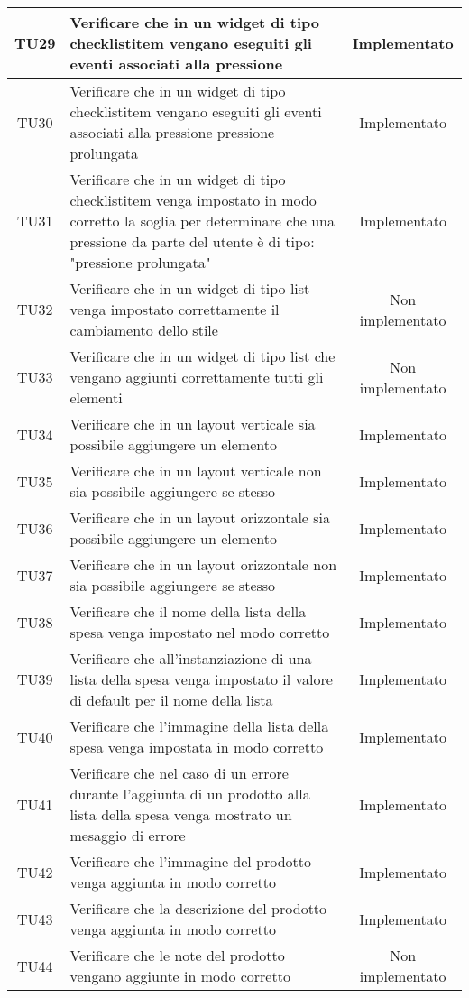 \begin{center}
\begin{longtable}{|c|>{\centering}m{10cm}|c|}
		TU29 & Verificare che in un widget di tipo checklistitem vengano eseguiti gli eventi associati alla pressione & Implementato \\ \hline
		TU30 & Verificare che in un widget di tipo checklistitem vengano eseguiti gli eventi associati alla pressione pressione prolungata & Implementato \\ \hline
		TU31 & Verificare che in un widget di tipo checklistitem venga impostato in modo corretto la soglia per determinare che una pressione da parte del utente è di tipo: "pressione prolungata" & Implementato \\ \hline
		TU32 & Verificare che in un widget di tipo list venga impostato correttamente il cambiamento dello stile & Non implementato \\ \hline
		TU33 & Verificare che in un widget di tipo list che vengano aggiunti correttamente tutti gli elementi & Non implementato \\ \hline
		TU34 & Verificare che in un layout verticale sia possibile aggiungere un elemento & Implementato \\ \hline
		TU35 & Verificare che in un layout verticale non sia possibile aggiungere se stesso & Implementato \\ \hline
		TU36 & Verificare che in un layout orizzontale sia possibile aggiungere un elemento & Implementato \\ \hline
		TU37 & Verificare che in un layout orizzontale non sia possibile aggiungere se stesso & Implementato \\ \hline
		TU38 & Verificare che il nome della lista della spesa venga impostato nel modo corretto & Implementato \\ \hline
		TU39 & Verificare che all'instanziazione di una lista della spesa venga impostato il valore di default per il nome della lista & Implementato \\ \hline
		TU40 & Verificare che l'immagine della lista della spesa venga impostata in modo corretto & Implementato \\ \hline
		TU41 & Verificare che nel caso di un errore durante l'aggiunta di un prodotto alla lista della spesa venga mostrato un mesaggio di errore & Implementato \\ \hline
		TU42 & Verificare che l'immagine del prodotto venga aggiunta in modo corretto & Implementato \\ \hline
		TU43 & Verificare che la descrizione del prodotto venga aggiunta in modo corretto & Implementato \\ \hline
		TU44 & Verificare che le note del prodotto vengano aggiunte in modo corretto & Non implementato \\ \hline

\end{longtable}
\end{center}
